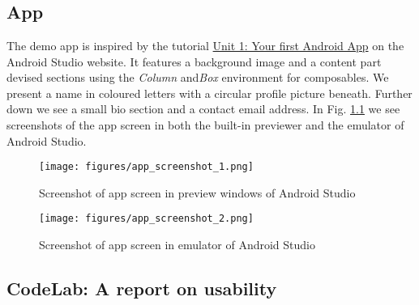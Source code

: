 \chapter{}

\section{App}
The demo app is inspired by the tutorial \href{https://developer.android.com/courses/android-basics-compose/unit-1}{Unit 1: Your first Android App} on the Android Studio website. It features a background image and a content part devised sections using the \textsl{Column} and\textsl{Box} environment for composables. We present a name in coloured letters with a circular profile picture beneath. Further down we see a small bio section and a contact email address.
In Fig. \ref{fig:app_screen} we see screenshots of the app screen in both the built-in previewer and the emulator of Android Studio.


\begin{figure}
	\centering
	\texttt{[image: figures/app\_screenshot\_1.png]}
	\caption{Screenshot of app screen in preview windows of Android Studio}
	\texttt{[image: figures/app\_screenshot\_2.png]}
	\caption{Screenshot of app screen in emulator of Android Studio}
	\label{fig:app_screen}
\end{figure}

\section{CodeLab: A report on usability}

